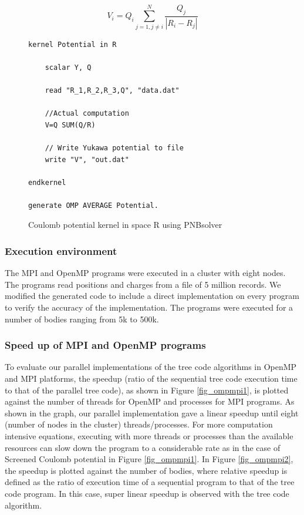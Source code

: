 \documentclass[draftclsnofoot]{elsarticle}
\begin{document}
\begin{equation}
\label{eqn_coul}
V_i=Q_i \sum \limits_{j=1, j \ne i}^{N} \frac{Q_j}{|R_i- R_j|} 
\end{equation}

\begin{figure}[!t]
\centering
\begin{lstlisting}[style=AMMA, language=PNB]
kernel Potential in R

	scalar Y, Q
	
	read "R_1,R_2,R_3,Q", "data.dat"

	//Actual computation
	V=Q SUM(Q/R)

	// Write Yukawa potential to file 
	write "V", "out.dat"
	
endkernel

generate OMP AVERAGE Potential. 
\end{lstlisting}
\caption{Coulomb potential kernel in space R using PNBsolver}
\label{fig_coul}
\end{figure}

\subsubsection{Execution environment}
The MPI and OpenMP programs were executed in a cluster with eight nodes. The programs read positions and charges from a file of 5 million records. We modified the generated
code to include a direct implementation on every program to verify the accuracy of the implementation. The programs were executed for a number of bodies ranging from 5k to 500k.
  
\subsubsection{Speed up of MPI and OpenMP programs}
To evaluate our parallel implementations of the tree code algorithms in  OpenMP and MPI platforms, the speedup (ratio of the sequential tree code execution time to that of the
parallel tree code), as shown in Figure \ref{fig_ompmpi1}, is plotted against the number of threads for OpenMP and processes for MPI programs. As shown in the graph, 
our parallel implementation gave a linear speedup until eight (number of nodes in the cluster) threads/processes. For more computation intensive equations, 
executing with more threads or processes than the available resources can slow down the program to a considerable rate as in the case of 
Screened Coulomb potential in Figure \ref{fig_ompmpi1}. 
In Figure \ref{fig_ompmpi2}, the speedup is plotted against 
the number of bodies, where relative speedup is defined as the ratio of execution time of a sequential program to that of the tree code program. 
In this case, super linear speedup is observed with the tree code algorithm. 
\end{document}
